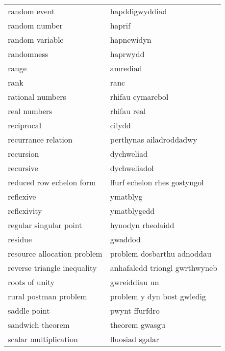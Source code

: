 \begin{supertabular}{p{0.22\textwidth}p{0.22\textwidth}}
                    random event &                  hapddigwyddiad \\
                   random number &                          haprif \\
                 random variable &                      hapnewidyn \\
                      randomness &                        haprwydd \\
                           range &                        amrediad \\
                            rank &                            ranc \\
                rational numbers &                rhifau cymarebol \\
                    real numbers &                     rhifau real \\
                      reciprocal &                          cilydd \\
             recurrance relation &         perthynas ailadroddadwy \\
                       recursion &                      dychweliad \\
                       recursive &                    dychweliadol \\
        reduced row echelon form &    ffurf echelon rhes gostyngol \\
                       reflexive &                        ymatblyg \\
                     reflexivity &                     ymatblygedd \\
          regular singular point &               hynodyn rheolaidd \\
                         residue &                         gwaddod \\
     resource allocation problem &      problem dosbarthu adnoddau \\
     reverse triangle inequality &   anhafaledd triongl gwrthwyneb \\
                  roots of unity &                   gwreiddiau un \\
           rural postman problem &      problem y dyn bost gwledig \\
                    saddle point &                  pwynt ffurfdro \\
                sandwich theorem &                  theorem gwasgu \\
           scalar multiplication &                 lluosiad sgalar \\

\end{supertabular}
